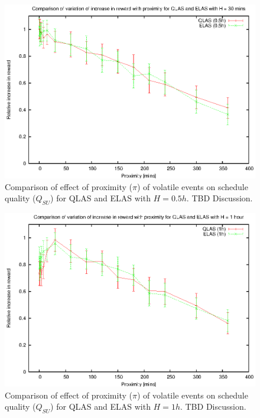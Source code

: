 
\begin{figure}[htbp]
\begin{center}
    \includegraphics[scale=1.0, angle=0]{figures/evplot_05.eps}
\end{center}
\caption[Comparison of effect of proximity ($\pi$) of volatile events on schedule quality ($Q_{SU}$) for QLAS and ELAS ($H = 0.5h$).]
{Comparison of effect of proximity ($\pi$) of volatile events on schedule quality ($Q_{SU}$) for QLAS and ELAS with $H = 0.5h$. TBD Discussion.}
\label{fig:vol_qe05_pi}
\end{figure}

\begin{figure}[htbp]
\begin{center}
    \includegraphics[scale=1.0, angle=0]{figures/evplot_1.eps}
\end{center}
\caption[Comparison of effect of proximity ($\pi$) of volatile events on schedule quality ($Q_{SU}$) for QLAS and ELAS ($H = 1h$).]
{Comparison of effect of proximity ($\pi$) of volatile events on schedule quality ($Q_{SU}$) for QLAS and ELAS with $H = 1h$. TBD Discussion.}
\label{fig:vol_qe05_pi}
\end{figure}

